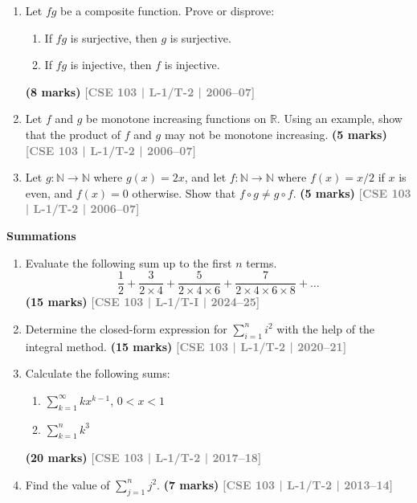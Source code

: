 \documentclass[12pt,a3paper]{article}
\newcommand{\yr}[1]{\hfill\textcolor{gray}{\small\textbf{[#1]}}}
\newcommand{\mk}[1]{\textcolor{orange!70!black}{\small\textbf{(#1 marks)}}}
\newcommand{\subtopic}[2]{%
  \vspace{10pt}
  \noindent\begin{tcolorbox}[colback=#1!8,colframe=#1,boxrule=0.6pt,arc=4pt,
    left=6pt,right=6pt,top=4pt,bottom=4pt]
    \small\bfseries\textcolor{#1}{#2}
  \end{tcolorbox}
  \vspace{2pt}
}
\begin{document}
\begin{enumerate}
\item Let $fg$ be a composite function. Prove or disprove:
\begin{enumerate}
  \item If $fg$ is surjective, then $g$ is surjective.
  \item If $fg$ is injective, then $f$ is injective.
\end{enumerate}
\mk{8} \yr{CSE 103 | L-1/T-2 | 2006--07}

\item Let $f$ and $g$ be monotone increasing functions on $\mathbb{R}$. Using an example, show that the product of $f$ and $g$ may not be monotone increasing.
\mk{5} \yr{CSE 103 | L-1/T-2 | 2006--07}

\item Let $g: \mathbb{N} \to \mathbb{N}$ where $g(x) = 2x$, and let $f: \mathbb{N} \to \mathbb{N}$ where $f(x) = x/2$ if $x$ is even, and $f(x) = 0$ otherwise. Show that $f \circ g \neq g \circ f$.
\mk{5} \yr{CSE 103 | L-1/T-2 | 2006--07}



\end{enumerate}


\subtopic{cB}{Summations}
\label{sub:s3-sum}

\begin{enumerate}


\item Evaluate the following sum up to the first $n$ terms.
$$\frac{1}{2} + \frac{3}{2 \times 4} + \frac{5}{2 \times 4 \times 6} + \frac{7}{2 \times 4 \times 6 \times 8} + \dots$$
\mk{15} \yr{CSE 103 | L-1/T-I | 2024--25}

\item Determine the closed-form expression for $\displaystyle\sum_{i=1}^{n} i^2$ with the help of the integral method.
\mk{15} \yr{CSE 103 | L-1/T-2 | 2020--21}

\item Calculate the following sums:
\begin{enumerate}
  \item $\displaystyle\sum_{k=1}^{\infty} k x^{k-1}$, \quad $0 < x < 1$
  \item $\displaystyle\sum_{k=1}^{n} k^3$
\end{enumerate}
\mk{20} \yr{CSE 103 | L-1/T-2 | 2017--18}


\item Find the value of $\displaystyle\sum_{j=1}^{n} j^2$.
\mk{7} \yr{CSE 103 | L-1/T-2 | 2013--14}


\end{enumerate}
\end{document}
